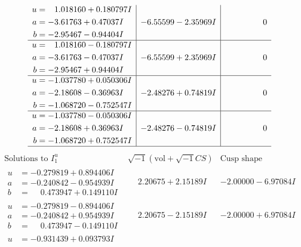 \documentclass[1p]{elsarticle_modified}
\theoremstyle{definition}
\newcommand{\I}{\sqrt{-1}}
\begin{document}
$$\begin{array}{c|c|c}
\begin{aligned}
u &= \phantom{-}1.018160 + 0.180797 I \\
a &= -3.61763 + 0.47037 I \\
b &= -2.95467 - 0.94404 I\end{aligned}
 & -6.55599 - 2.35969 I & \phantom{-0.000000 } 0 \\ \hline\begin{aligned}
u &= \phantom{-}1.018160 - 0.180797 I \\
a &= -3.61763 - 0.47037 I \\
b &= -2.95467 + 0.94404 I\end{aligned}
 & -6.55599 + 2.35969 I & \phantom{-0.000000 } 0 \\ \hline\begin{aligned}
u &= -1.037780 + 0.050306 I \\
a &= -2.18608 - 0.36963 I \\
b &= -1.068720 - 0.752547 I\end{aligned}
 & -2.48276 + 0.74819 I & \phantom{-0.000000 } 0 \\ \hline\begin{aligned}
u &= -1.037780 - 0.050306 I \\
a &= -2.18608 + 0.36963 I \\
b &= -1.068720 + 0.752547 I\end{aligned}
 & -2.48276 - 0.74819 I & \phantom{-0.000000 } 0\\
 \hline 
 \end{array}$$\newpage$$\begin{array}{c|c|c}  
\text{Solutions to }I^u_{1}& \I (\text{vol} + \sqrt{-1}CS) & \text{Cusp shape}\\
 \hline 
\begin{aligned}
u &= -0.279819 + 0.894406 I \\
a &= -0.240842 - 0.954939 I \\
b &= \phantom{-}0.473947 + 0.149110 I\end{aligned}
 & \phantom{-}2.20675 + 2.15189 I & -2.00000 - 6.97084 I \\ \hline\begin{aligned}
u &= -0.279819 - 0.894406 I \\
a &= -0.240842 + 0.954939 I \\
b &= \phantom{-}0.473947 - 0.149110 I\end{aligned}
 & \phantom{-}2.20675 - 2.15189 I & -2.00000 + 6.97084 I \\ \hline\begin{aligned}
u &= -0.931439 + 0.093793 I \\

\end{aligned}
\end{array}$$
\end{document}
